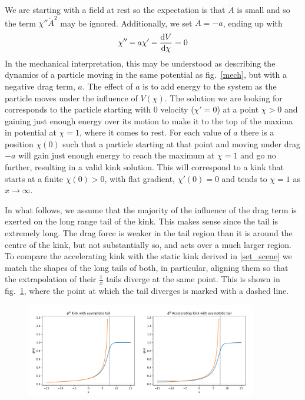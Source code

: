 \documentclass[11pt, oneside]{article}  	%
\numberwithin{equation}{section}
\newcommand{\drv}{\ensuremath{\textup{d}}}
\begin{document}
 We are starting with a field at rest so the expectation is that $\dot{A}$ is small and so the term $\chi '' \dot{A}^2$ may be ignored. Additionally, we set $\ddot{A} = -a$, ending up with
 \begin{equation} \label{acc_kink}
 \chi'' - a\chi' - \frac{\drv V }{\drv \chi}=0
 \end{equation}
In the mechanical interpretation, this may be understood as describing the dynamics of a particle moving in the same potential as fig.~\ref{mech}, but with a negative drag term, $a$. The effect of $a$ is to add energy to the system as the particle moves under the influence of $V(\chi)$. The solution we are looking for corresponds to the particle starting with 0 velocity ($\chi' = 0$) at a point $\chi >0$ and gaining just enough energy over its motion to make it to the top of the maxima in potential at $\chi=1$, where it comes to rest. For each value of $a$ there is a position $\chi(0)$ such that a particle starting at that point and moving under drag $-a$ will gain just enough energy to reach the maximum at $\chi=1$ and go no further, resulting in a valid kink solution. This will correspond to a kink that starts at a finite $\chi(0)>0$, with flat gradient, $\chi'(0)=0$ and tends to $\chi=1$ as $x \rightarrow \infty$.\par
In what follows, we assume that the majority of the influence of the drag term is exerted on the long range tail of the kink. This makes sense since the tail is extremely long. The drag force is weaker in the tail region than it is around the centre of the kink, but not substantially so, and acts over a much larger region. To compare the accelerating kink with the static kink derived in \textsection \ref{set_scene} we match the shapes of the long tails of both, in particular, aligning them so that the extrapolation of their $\frac{1}{x}$ tails diverge at the same point. This is shown in fig.~\ref{tails}, where the point at which the tail diverges is marked with a dashed line.\par
\begin{figure}
\centering
\includegraphics[width=0.9\textwidth]{asym_tails.png}
 \label{tails}
\end{figure}
\end{document}
